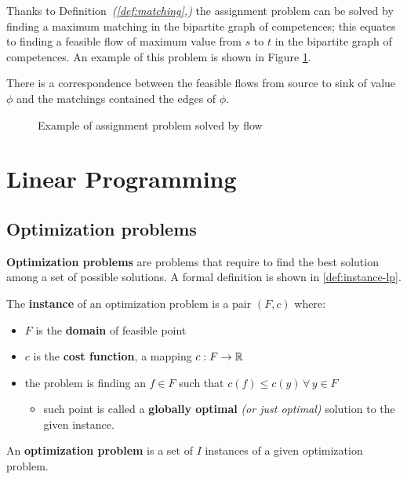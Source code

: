 \documentclass[english]{article}
\begin{document}
Thanks to Definition~\textit{(\ref{def:matching},)} the assignment problem can be solved by finding a maximum matching in the bipartite graph of competences;
this equates to finding a feasible flow of maximum value from \(s\) to \(t\) in the bipartite graph of competences.
An example of this problem is shown in Figure \ref{fig:assignment-flow-example}.

There is a correspondence between the feasible flows from source to sink of value \(\phi\) and the matchings contained the edges of \(\phi\).

\begin{figure}[htbp]
  \bigskip
  \centering
  \caption{Example of assignment problem solved by flow}
  \label{fig:assignment-flow-example}
  \bigskip
\end{figure}

\clearpage

\section{Linear Programming}
\label{sec:linear-programming}

\subsection{Optimization problems}

\textbf{Optimization problems} are problems that require to find the best solution among a set of possible solutions.
A formal definition is shown in \ref{def:instance-lp}.

\begin{definition}
  \label{def:instance-lp}
  The \textbf{instance} of an optimization problem is a pair \(\left( F, c \right)\) where:
  \begin{itemize}
    \item \(F\) is the \textbf{domain} of feasible point
    \item \(c\) is the \textbf{cost function}, a mapping \(c :  F \rightarrow \mathbb{R}\)
    \item the problem is finding an \(f \in F\) such that \(c\left( f \right) \leq c\left( y \right) \, \forall \, y \in F\)
          \begin{itemize}
            \item such point is called a \textbf{globally optimal} \textit{(or just optimal)} solution to the given instance.
          \end{itemize}
  \end{itemize}

  An \textbf{optimization problem} is a set of \(I\) instances of a given optimization problem.
\end{definition}
\end{document}
